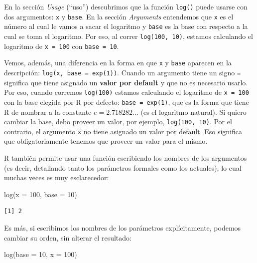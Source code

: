 \documentclass[
]{book}
\newenvironment{Shaded}{\begin{snugshade}}{\end{snugshade}}
\newcommand{\AttributeTok}[1]{\textcolor[rgb]{0.77,0.63,0.00}{#1}}
\newcommand{\DecValTok}[1]{\textcolor[rgb]{0.00,0.00,0.81}{#1}}
\newcommand{\FunctionTok}[1]{\textcolor[rgb]{0.00,0.00,0.00}{#1}}
\newcommand{\NormalTok}[1]{#1}
\begin{document}
En la sección \emph{Usage} (``uso'') descubrimos que la función \texttt{log()} puede usarse con dos argumentos: \texttt{x} y \texttt{base}. En la sección \emph{Arguments} entendemos que \texttt{x} es el número al cual le vamos a sacar el logaritmo y \texttt{base} es la base con respecto a la cual se toma el logaritmo. Por eso, al correr \texttt{log(100,\ 10)}, estamos calculando el logaritmo de \texttt{x\ =\ 100} con \texttt{base\ =\ 10}.

Vemos, además, una diferencia en la forma en que \texttt{x} y \texttt{base} aparecen en la descripción: \texttt{log(x,\ base\ =\ exp(1))}. Cuando un argumento tiene un signo \texttt{=} significa que tiene asignado un \textbf{valor por default} y que no es necesario usarlo. Por eso, cuando corremos \texttt{log(100)} estamos calculando el logaritmo de \texttt{x\ =\ 100} con la base elegida por R por defecto: \texttt{base\ =\ exp(1)}, que es la forma que tiene R de nombrar a la constante \(e = 2.718282...\) (es el logaritmo natural). Si quiero cambiar la base, debo proveer un valor, por ejemplo, \texttt{log(100,\ 10)}. Por el contrario, el argumento \texttt{x} no tiene asignado un valor por default. Eso significa que obligatoriamente tenemos que proveer un valor para el mismo.

R también permite usar una función escribiendo los nombres de los argumentos (es decir, detallando tanto los parámetros formales como los actuales), lo cual muchas veces es muy esclarecedor:

\begin{Shaded}
\begin{Highlighting}[]
\FunctionTok{log}\NormalTok{(}\AttributeTok{x =} \DecValTok{100}\NormalTok{, }\AttributeTok{base =} \DecValTok{10}\NormalTok{)}
\end{Highlighting}
\end{Shaded}

\begin{verbatim}
[1] 2
\end{verbatim}

Es más, si escribimos los nombres de los parámetros explícitamente, podemos cambiar su orden, sin alterar el resultado:

\begin{Shaded}
\begin{Highlighting}[]
\FunctionTok{log}\NormalTok{(}\AttributeTok{base =} \DecValTok{10}\NormalTok{, }\AttributeTok{x =} \DecValTok{100}\NormalTok{)}
\end{Highlighting}
\end{Shaded}
\end{document}
